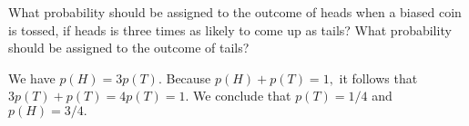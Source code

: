 \documentclass[../main.tex]{subfiles}
\begin{document}
What probability should be assigned to the outcome of heads when a biased coin is tossed, if heads is three times as likely to come up as tails?
What probability should be assigned to the outcome of tails?

\solution
We have
\(
	p(H) = 3p(T).
\)
Because
\(
	p(H) + p(T) = 1,
\)
it follows that
\(
	3p(T) + p(T) = 4p(T) = 1.
\)
We conclude that
\(
	p(T) = 1/4
\)
and
\(
	p(H) = 3/4.
\)
\end{document}
